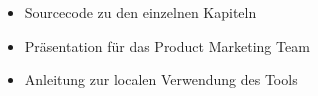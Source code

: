 
\addchap{\appendixPhrase}


\begin{itemize}
\item Sourcecode zu den einzelnen Kapiteln
\item Präsentation für das Product Marketing Team
\item Anleitung zur localen Verwendung des Tools
\end{itemize}